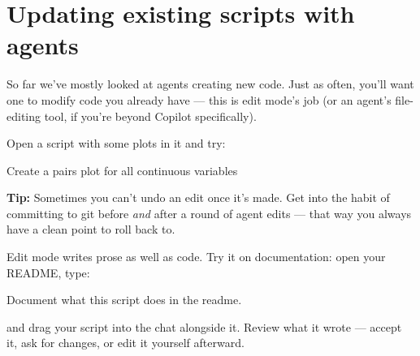 \documentclass[
  letterpaper,
  DIV=11,
  numbers=noendperiod]{scrreprt}
\begin{document}
\chapter{Updating existing scripts with
agents}\label{updating-existing-scripts-with-agents}

So far we've mostly looked at agents creating new code. Just as often,
you'll want one to modify code you already have --- this is edit mode's
job (or an agent's file-editing tool, if you're beyond Copilot
specifically).

Open a script with some plots in it and try:

\begin{tcolorbox}[enhanced jigsaw, bottomtitle=1mm, leftrule=.75mm, breakable, colbacktitle=quarto-callout-note-color!10!white, colframe=quarto-callout-note-color-frame, coltitle=black, toprule=.15mm, rightrule=.15mm, left=2mm, bottomrule=.15mm, title=\textcolor{quarto-callout-note-color}{\faInfo}\hspace{0.5em}{Prompt}, opacityback=0, arc=.35mm, toptitle=1mm, titlerule=0mm, opacitybacktitle=0.6, colback=white]

Create a pairs plot for all continuous variables

\end{tcolorbox}

\textbf{Tip:} Sometimes you can't undo an edit once it's made. Get into
the habit of committing to git before \emph{and} after a round of agent
edits --- that way you always have a clean point to roll back to.

Edit mode writes prose as well as code. Try it on documentation: open
your README, type:

\begin{tcolorbox}[enhanced jigsaw, bottomtitle=1mm, leftrule=.75mm, breakable, colbacktitle=quarto-callout-note-color!10!white, colframe=quarto-callout-note-color-frame, coltitle=black, toprule=.15mm, rightrule=.15mm, left=2mm, bottomrule=.15mm, title=\textcolor{quarto-callout-note-color}{\faInfo}\hspace{0.5em}{Prompt}, opacityback=0, arc=.35mm, toptitle=1mm, titlerule=0mm, opacitybacktitle=0.6, colback=white]

Document what this script does in the readme.

\end{tcolorbox}

and drag your script into the chat alongside it. Review what it wrote
--- accept it, ask for changes, or edit it yourself afterward.
\end{document}
